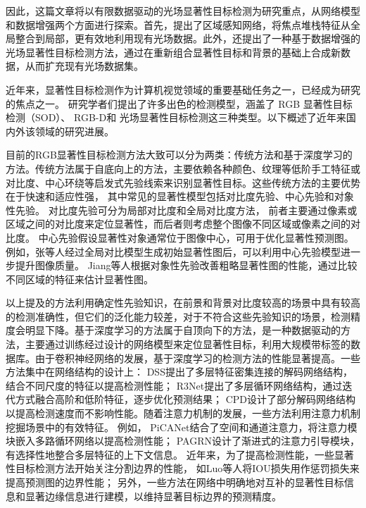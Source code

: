 因此，这篇文章将以有限数据驱动的光场显著性目标检测为研究重点，从网络模型和数据增强两个方面进行探索。首先，提出了区域感知网络，将焦点堆栈特征从全局整合到局部，更有效地利用现有光场数据。此外，还提出了一种基于数据增强的光场显著性目标检测方法，通过在重新组合显著性目标和背景的基础上合成新数据，从而扩充现有光场数据集。  




近年来，显著性目标检测作为计算机视觉领域的重要基础任务之一，已经成为研究的焦点之一。
研究学者们提出了许多出色的检测模型，涵盖了
RGB 显著性目标检测（SOD）、
RGB-D和
光场显著性目标检测这三种类型。以下概述了近年来国内外该领域的研究进展。







目前的RGB显著性目标检测方法大致可以分为两类：传统方法和基于深度学习的方法。传统方法属于自底向上的方法，主要依赖各种颜色、纹理等低阶手工特征或对比度、中心环绕等启发式先验线索来识别显著性目标。这些传统方法的主要优势在于快速和适应性强，
其中常见的显著性模型包括对比度先验、中心先验和对象性先验。
对比度先验可分为局部对比度和全局对比度方法，
前者主要通过像素或区域之间的对比度来定位显著性，而后者则考虑整个图像不同区域或像素之间的对比度。
中心先验假设显著性对象通常位于图像中心，可用于优化显著性预测图。
例如，张等人经过全局对比模型生成初始显著性图后，可以利用中心先验模型进一步提升图像质量。
Jiang等人根据对象性先验改善粗略显著性图的性能，通过比较不同区域的特征来估计显著性图。


以上提及的方法利用确定性先验知识，在前景和背景对比度较高的场景中具有较高的检测准确性，但它们的泛化能力较差，对于不符合这些先验知识的场景，检测精度会明显下降。基于深度学习的方法属于自顶向下的方法，是一种数据驱动的方法，主要通过训练经过设计的网络模型来定位显著性目标，利用大规模带标签的数据库。由于卷积神经网络的发展，基于深度学习的检测方法的性能显著提高。一些方法集中在网络结构的设计上：
DSS提出了多层特征密集连接的解码网络结构，结合不同尺度的特征以提高检测性能；
R3Net提出了多层循环网络结构，通过迭代方式融合高阶和低阶特征，逐步优化预测结果；
CPD设计了部分解码网络结构以提高检测速度而不影响性能。随着注意力机制的发展，一些方法利用注意力机制挖掘场景中的有效特征。
例如，
PiCANet结合了空间和通道注意力，将注意力模块嵌入多路循环网络以提高检测性能；
PAGRN设计了渐进式的注意力引导模块，有选择性地整合多层特征的上下文信息。
近年来，为了提高检测性能，一些显著性目标检测方法开始关注分割边界的性能，
如Luo等人将IOU损失用作惩罚损失来提高预测图的边界性能；
另外，一些方法在网络中明确地对互补的显著性目标信息和显著边缘信息进行建模，以维持显著目标边界的预测精度。






